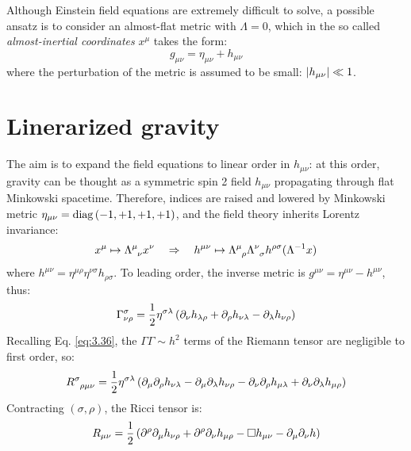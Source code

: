 
Although Einstein field equations are extremely difficult to solve, a possible ansatz is to consider an almost-flat metric with $ \Lambda = 0 $, which in the so called \textit{almost-inertial coordinates} $ x^\mu $ takes the form:
\begin{equation}
  g_{\mu \nu} = \eta_{\mu \nu} + h_{\mu \nu}
  \label{eq:5.1}
\end{equation}
where the perturbation of the metric is assumed to be small: $ \left\lvert h_{\mu \nu}\right\rvert \ll 1 $.

\section{Linerarized gravity}

The aim is to expand the field equations to linear order in $ h_{\mu \nu} $: at this order, gravity can be thought as a symmetric spin 2 field $ h_{\mu \nu} $ propagating through flat Minkowski spacetime. Therefore, indices are raised and lowered by Minkowski metric $ \eta_{\mu \nu} = \operatorname{diag} \left( -1,+1,+1,+1 \right) $, and the field theory inherits Lorentz invariance:
\begin{equation*}
  x^\mu \mapsto \tensor{\Lambda}{^\mu_\nu} x^\nu
  \quad \Rightarrow \quad
  h^{\mu \nu} \mapsto \tensor{\Lambda}{^\mu_\rho} \tensor{\Lambda}{^\nu_\sigma} h^{\rho \sigma} (\Lambda^{-1} x)
\end{equation*}
where $ h^{\mu \nu} = \eta^{\mu \rho} \eta^{\nu \sigma} h_{\rho \sigma} $. To leading order, the inverse metric is $ g^{\mu \nu} = \eta^{\mu \nu} - h^{\mu \nu} $, thus:
\begin{equation}
  \Gamma^\sigma_{\nu \rho} = \frac{1}{2} \eta^{\sigma \lambda} \left( \partial_\nu h_{\lambda \rho} + \partial_\rho h_{\nu \lambda} - \partial_\lambda h_{\nu \rho} \right)
  \label{eq:5.2}
\end{equation}
Recalling Eq. \ref{eq:3.36}, the $ \Gamma \Gamma \sim h^2 $ terms of the Riemann tensor are negligible to first order, so:
\begin{equation}
  \tensor{R}{^\sigma_{\rho \mu \nu}} = \frac{1}{2} \eta^{\sigma \lambda} \left( \pa_\mu \pa_\rho h_{\nu \lambda} - \pa_\mu \pa_\lambda h_{\nu \rho} - \pa_\nu \pa_\rho h_{\mu \lambda} + \pa_\nu \pa_\lambda h_{\mu \rho} \right)
  \label{eq:5.3}
\end{equation}
Contracting $ (\sigma,\rho) $, the Ricci tensor is:
\begin{equation}
  R_{\mu \nu} = \frac{1}{2} \left( \partial^\rho \partial_\mu h_{\nu \rho} + \partial^\rho \partial_\nu h_{\mu \rho} - \Box h_{\mu \nu} - \partial_\mu \partial_\nu h \right)
  \label{eq:5.4}
\end{equation}
